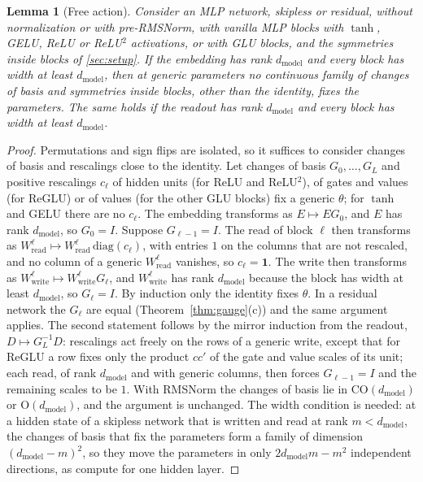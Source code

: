 \documentclass[10pt]{article}
\newtheorem{lemma}[theorem]{Lemma}
\theoremstyle{definition}
\theoremstyle{remark}
\newcommand{\Wread}{W_{\mathrm{read}}}
\newcommand{\Wwrite}{W_{\mathrm{write}}}
\newcommand{\dm}{d_{\mathrm{model}}}
\newcommand{\Ort}{\mathrm{O}}
\newcommand{\CO}{\mathrm{CO}}
\begin{document}
\begin{lemma}[Free action]\label{lem:free}
Consider an MLP network, skipless or residual, without normalization or with pre-RMSNorm, with vanilla MLP blocks with $\tanh$, GELU, ReLU or ReLU$^2$ activations, or with GLU blocks, and the symmetries inside blocks of \cref{sec:setup}. If the embedding has rank $\dm$ and every block has width at least $\dm$, then at generic parameters no continuous family of changes of basis and symmetries inside blocks, other than the identity, fixes the parameters. The same holds if the readout has rank $\dm$ and every block has width at least $\dm$.
\end{lemma}

\begin{proof}
Permutations and sign flips are isolated, so it suffices to consider changes of basis and rescalings close to the identity. Let changes of basis $G_0, \dots, G_L$ and positive rescalings $c_\ell$ of hidden units (for ReLU and ReLU$^2$), of gates and values (for ReGLU) or of values (for the other GLU blocks) fix a generic $\theta$; for $\tanh$ and GELU there are no $c_\ell$. The embedding transforms as $E \mapsto EG_0$, and $E$ has rank $\dm$, so $G_0 = I$. Suppose $G_{\ell-1} = I$. The read of block $\ell$ then transforms as $\Wread^\ell \mapsto \Wread^\ell\,\mathrm{diag}(c_\ell)$, with entries $1$ on the columns that are not rescaled, and no column of a generic $\Wread^\ell$ vanishes, so $c_\ell = \mathbf 1$. The write then transforms as $\Wwrite^\ell \mapsto \Wwrite^\ell G_\ell$, and $\Wwrite^\ell$ has rank $\dm$ because the block has width at least $\dm$, so $G_\ell = I$. By induction only the identity fixes $\theta$. In a residual network the $G_\ell$ are equal (Theorem~\ref{thm:gauge}(c)) and the same argument applies. The second statement follows by the mirror induction from the readout, $D \mapsto G_L^{-1}D$: rescalings act freely on the rows of a generic write, except that for ReGLU a row fixes only the product $cc'$ of the gate and value scales of its unit; each read, of rank $\dm$ and with generic columns, then forces $G_{\ell-1} = I$ and the remaining scales to be $1$. With RMSNorm the changes of basis lie in $\CO(\dm)$ or $\Ort(\dm)$, and the argument is unchanged. The width condition is needed: at a hidden state of a skipless network that is written and read at rank $m < \dm$, the changes of basis that fix the parameters form a family of dimension $(\dm-m)^2$, so they move the parameters in only $2\dm m - m^2$ independent directions, as \citet[Proposition~C.3]{zhao2023symmetries} compute for one hidden layer.
\end{proof}
\end{document}
